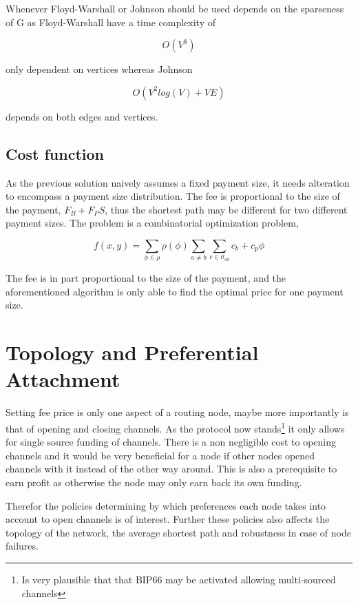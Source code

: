 Whenever Floyd-Warshall or Johnson should be used depends on the sparseness of G as Floyd-Warshall have a time complexity of

\[ O(V^3) \]

only dependent on vertices whereas Johnson

\[ O(V^2 log(V) + VE ) \]

depends on both edges and vertices. 

\subsection{Cost function}

As the previous solution naively assumes a fixed payment size, it needs alteration to encompass a payment size distribution.
The fee is proportional to the size of the payment, $F_B + F_P S$, thus the shortest path may be different for two different payment sizes. 
The problem is a combinatorial optimization problem,

\[ f(x, y) = \sum_{\phi\in \rho} \rho(\phi) \sum_{a \neq b}\sum_{c \in \sigma_{ab}} 
	 c_b + c_p\phi  
\]



The fee is in part proportional to the size of the payment, and the aforementioned algorithm is only able to find the optimal price for one payment size.

 

\section{Topology and Preferential Attachment}

Setting fee price is only one aspect of a routing node, maybe more importantly is that of opening and closing channels.
As the protocol now stands\footnote{Is very plausible that that BIP66 may be activated allowing multi-sourced channels\cite{bip:0118:sighash:noinput}} it only allows for single source funding of channels. There is a non negligible cost to opening channels and it would be very beneficial for a node if other nodes opened channels with it instead of the other way around. This is also a prerequisite to earn profit as otherwise the node may only earn back its own funding. 

Therefor the policies determining by which preferences each node takes into account to open channels is of interest. Further these policies also affects the topology of the network, the average shortest path and robustness in case of node failures.

